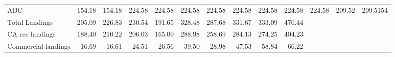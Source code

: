 \documentclass[11pt,
  english,
  a4paper,
]{article}
\begin{document}
\begin{table}
{\begin{tabular}[t]{lrrrrrrrrrrrr}
\hspace{1em}ABC & 154.18 & 154.18 & 224.58 & 224.58 & 224.58 & 224.58 & 224.58 & 224.58 & 224.58 & 224.58 & 209.52 & 209.5154\\
\hspace{1em}Total Landings & 205.09 & 226.83 & 230.54 & 191.65 & 328.48 & 287.68 & 331.67 & 333.09 & 470.44 &  &  & \\
\hspace{1em}CA rec landings & 188.40 & 210.22 & 206.03 & 165.09 & 288.98 & 258.69 & 284.13 & 274.25 & 404.23 &  &  & \\
\hspace{1em}Commercial landings & 16.69 & 16.61 & 24.51 & 26.56 & 39.50 & 28.98 & 47.53 & 58.84 & 66.22 &  &  & \\
\bottomrule
\end{tabular}}
\end{table}





\begingroup\fontsize{10}{12}\selectfont
\end{document}
